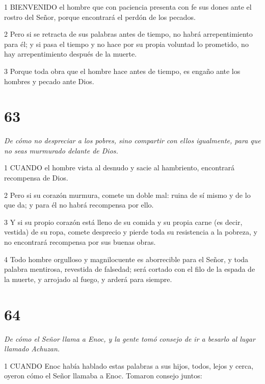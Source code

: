 \par 1 BIENVENIDO el hombre que con paciencia presenta con fe sus dones ante el rostro del Señor, porque encontrará el perdón de los pecados.

\par 2 Pero si se retracta de sus palabras antes de tiempo, no habrá arrepentimiento para él; y si pasa el tiempo y no hace por su propia voluntad lo prometido, no hay arrepentimiento después de la muerte.

\par 3 Porque toda obra que el hombre hace antes de tiempo, es engaño ante los hombres y pecado ante Dios.



\chapter{63}

\par \textit{De cómo no despreciar a los pobres, sino compartir con ellos igualmente, para que no seas murmurado delante de Dios.}

\par 1 CUANDO el hombre vista al desnudo y sacie al hambriento, encontrará recompensa de Dios.

\par 2 Pero si su corazón murmura, comete un doble mal: ruina de sí mismo y de lo que da; y para él no habrá recompensa por ello.

\par 3 Y si su propio corazón está lleno de su comida y su propia carne (es decir, vestida) de su ropa, comete desprecio y pierde toda su resistencia a la pobreza, y no encontrará recompensa por sus buenas obras.

\par 4 Todo hombre orgulloso y magnilocuente es aborrecible para el Señor, y toda palabra mentirosa, revestida de falsedad; será cortado con el filo de la espada de la muerte, y arrojado al fuego, y arderá para siempre.

\chapter{64}

\par \textit{De cómo el Señor llama a Enoc, y la gente tomó consejo de ir a besarlo al lugar llamado Achuzan.}

\par 1 CUANDO Enoc había hablado estas palabras a sus hijos, todos, lejos y cerca, oyeron cómo el Señor llamaba a Enoc. Tomaron consejo juntos:


